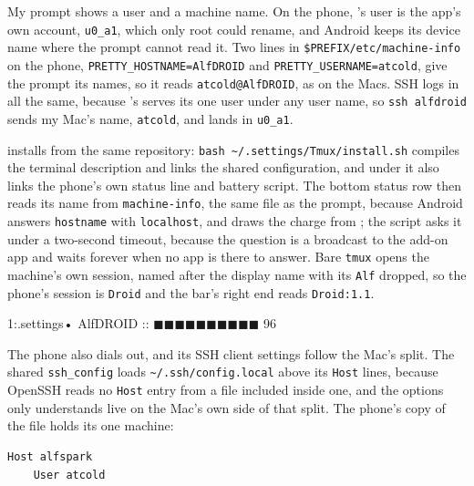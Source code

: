 \documentclass[11pt,a4paper]{article}
\begin{document}
My prompt shows a user and a machine name. On the phone, 's user is the app's own account, \texttt{u0\_a1}, which only root could rename, and Android keeps its device name where the prompt cannot read it. Two lines in \texttt{\$PREFIX/etc/machine-info} on the phone, \texttt{PRETTY\_HOSTNAME=AlfDROID} and \texttt{PRETTY\_USERNAME=atcold}, give the prompt its names, so it reads \texttt{atcold@AlfDROID}, as on the Macs. SSH logs in all the same, because 's  serves its one user under any user name, so \texttt{ssh alfdroid} sends my Mac's name, \texttt{atcold}, and lands in \texttt{u0\_a1}.

 installs from the same repository: \texttt{bash \textasciitilde/.settings/Tmux/install.sh} compiles the terminal description and links the shared configuration, and under  it also links the phone's own status line and battery script. The bottom status row then reads its name from \texttt{machine-info}, the same file as the prompt, because Android answers \texttt{hostname} with \texttt{localhost}, and draws the charge from ; the script asks it under a two-second timeout, because the question is a broadcast to the add-on app and waits forever when no app is there to answer. Bare \texttt{tmux} opens the machine's own session, named after the display name with its \texttt{Alf} dropped, so the phone's session is \texttt{Droid} and the bar's right end reads \texttt{Droid:1.1}.

\begin{cmdout}
                                                   1:.settings•
AlfDROID :: ◼◼◼◼◼◼◼◼◼◼ 96%
\end{cmdout}

The phone also dials out, and its SSH client settings follow the Mac's split. The shared \texttt{ssh\_config} loads \texttt{\textasciitilde/.ssh/config.local} above its \texttt{Host} lines, because OpenSSH reads no \texttt{Host} entry from a file included inside one, and the options only  understands live on the Mac's own side of that split. The phone's copy of the file holds its one machine:

\begin{lstlisting}[style=out]
Host alfspark
    User atcold
\end{lstlisting}
\end{document}

